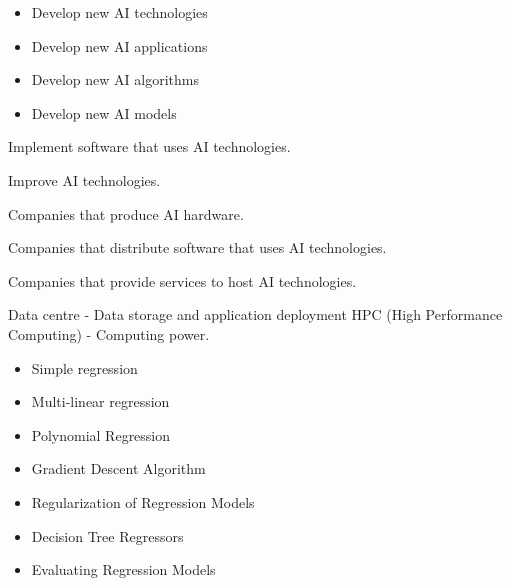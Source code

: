 \documentclass[12pt letter]{report}
\begin{document}
\begin{itemize}
  \item Develop new AI technologies
  \item Develop new AI applications
  \item Develop new AI algorithms
  \item Develop new AI models
\end{itemize}


Implement software that uses AI technologies.


Improve AI technologies.


Companies that produce AI hardware.


Companies that distribute software that uses AI technologies.


Companies that provide services to host AI technologies.

Data centre - Data storage and application deployment
HPC (High Performance Computing) - Computing power.

\begin{itemize}
  \item Simple regression
  \item Multi-linear regression
  \item Polynomial Regression
  \item Gradient Descent Algorithm
  \item Regularization of Regression Models
  \item Decision Tree Regressors
  \item Evaluating Regression Models
\end{itemize}
\end{document}
